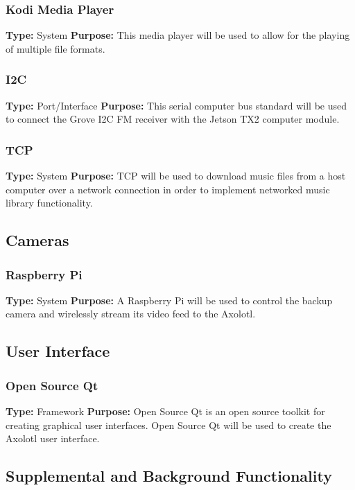 \documentclass[onecolumn, draftclsnofoot,10pt, compsoc]{IEEEtran}
\begin{document}
\subsubsection{Kodi Media Player}
\textbf{Type:} System \newline
\textbf{Purpose:} This media player will be used to allow for the playing of multiple file formats. 

\subsubsection{I2C}
\textbf{Type:} Port/Interface \newline
\textbf{Purpose:} This serial computer bus standard will be used to connect the Grove I2C FM receiver with the Jetson TX2 computer module.

\subsubsection{TCP}
\textbf{Type:} System \newline
\textbf{Purpose:} TCP will be used to download music files from a host computer over a network connection in order to implement networked music library functionality.

\subsection{Cameras}
\subsubsection{Raspberry Pi}
\textbf{Type:} System \newline
\textbf{Purpose:} A Raspberry Pi will be used to control the backup camera and wirelessly stream its video feed to the Axolotl.

\subsection{User Interface}
\subsubsection{Open Source Qt}
\textbf{Type:} Framework \newline
\textbf{Purpose:} Open Source Qt is an open source toolkit for creating graphical user interfaces. Open Source Qt will be used to create the Axolotl user interface.

\subsection{Supplemental and Background Functionality}
\end{document}
